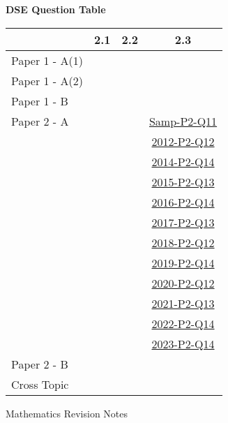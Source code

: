 \documentclass[12pt, a4paper]{article}
\begin{document}
\begin{absolutelynopagebreak}
\begin{center}
\textbf{DSE Question Table}
\end{center}
\begin{center}
\begin{tabular}{|l|c|c|c|}
\hline
        & 2.1 & 2.2 & 2.3 \\\hline
\hline
Paper 1 - A(1)&  &  &  \\
\hline
Paper 1 - A(2)&  &  &  \\
\hline
Paper 1 - B&  &  &  \\
\hline
\hline
Paper 2 - A&  &  & \hyperref[DSE2012S-CoreP2-Q11]{Samp-P2-Q11} \\
&  &  & \hyperref[DSE2012-CoreP2-Q12]{2012-P2-Q12} \\
&  &  & \hyperref[DSE2014-CoreP2-Q14]{2014-P2-Q14} \\
&  &  & \hyperref[DSE2015-CoreP2-Q13]{2015-P2-Q13} \\
&  &  & \hyperref[DSE2016-CoreP2-Q14]{2016-P2-Q14} \\
&  &  & \hyperref[DSE2017-CoreP2-Q13]{2017-P2-Q13} \\
&  &  & \hyperref[DSE2018-CoreP2-Q12]{2018-P2-Q12} \\
&  &  & \hyperref[DSE2019-CoreP2-Q14]{2019-P2-Q14} \\
&  &  & \hyperref[DSE2020-CoreP2-Q12]{2020-P2-Q12} \\
&  &  & \hyperref[DSE2021-CoreP2-Q13]{2021-P2-Q13} \\
&  &  & \hyperref[DSE2022-CoreP2-Q14]{2022-P2-Q14} \\
&  &  & \hyperref[DSE2023-CoreP2-Q14]{2023-P2-Q14} \\
\hline
Paper 2 - B&  &  &  \\
\hline
\hline
Cross Topic&  &  &  \\
\hline
\end{tabular}
\end{center}
\end{absolutelynopagebreak}
\newpage
\newpage
\thispagestyle{empty}
\begin{center}
Mathematics Revision Notes\\\vspace{1cm}
\\\vspace{1cm}
{\fontsize{24pt}{24pt}\selectfont {Algebraic Equations in One Unknown}} \\\vspace{1cm}
\label{chapter:S1-3}

\end{center}
\vspace{0.5cm}
\hline
\end{document}
